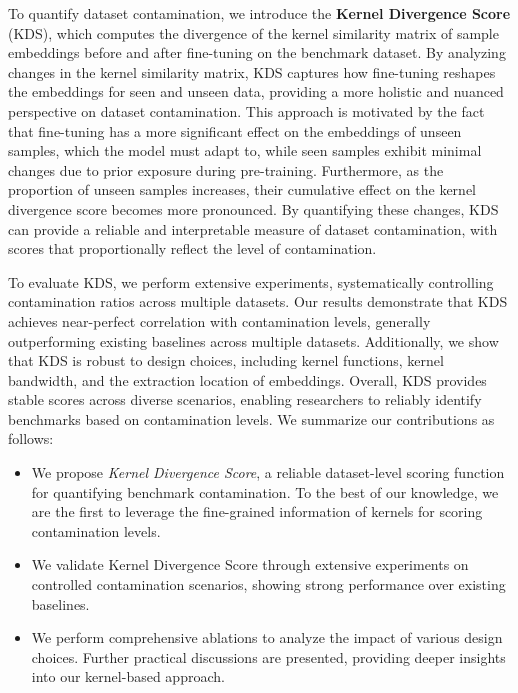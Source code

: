 To quantify dataset contamination, we introduce the \textbf{Kernel Divergence Score} (KDS), which computes the divergence of the kernel similarity matrix of sample embeddings before and after fine-tuning on the benchmark dataset. By analyzing changes in the kernel similarity matrix, KDS captures how fine-tuning reshapes the embeddings for seen and unseen data, providing a more holistic and nuanced perspective on dataset contamination.
This approach is motivated by the fact that fine-tuning has a more significant effect on the embeddings of unseen samples, which the model must adapt to, while seen samples exhibit minimal changes due to prior exposure during pre-training. Furthermore, as the proportion of unseen samples increases, their cumulative effect on the kernel divergence score becomes more pronounced. By quantifying these changes, KDS can provide a reliable and interpretable measure of dataset contamination, with scores that proportionally reflect the level of contamination. 


To evaluate KDS, we perform extensive experiments, systematically controlling contamination ratios across multiple datasets.  
Our results demonstrate that KDS achieves near-perfect correlation with contamination levels, generally outperforming existing baselines across multiple datasets.
Additionally, we show that KDS is robust to design choices, including kernel functions, kernel bandwidth, and the extraction location of embeddings.
Overall, KDS provides stable scores across diverse scenarios, enabling researchers to reliably identify benchmarks based on contamination levels. We summarize our {contributions} as follows: 


\vspace{-2mm}
\begin{itemize}[leftmargin=*]
    \item We propose \textit{Kernel Divergence Score}, a reliable dataset-level scoring function for quantifying benchmark contamination. To the best of our knowledge, we are the first to leverage the fine-grained information of kernels for scoring contamination levels.
    \item We validate Kernel Divergence Score through extensive experiments on controlled contamination scenarios, showing strong performance over existing baselines. 
    \item We perform comprehensive ablations to analyze the impact of various design choices. Further practical discussions are presented, providing deeper insights into our kernel-based approach.
\end{itemize}
